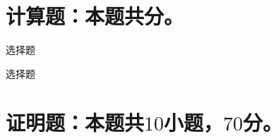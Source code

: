 \documentclass[12pt, a4paper]{article}
\def\mycenter#1{\begin{center} \bf \sffamily \large #1 \end{center}}
\begin{document}
\section{计算题：本题共\textmd{}分。}
\begin{question}[resume]
    \item 选择题 \\
    

    \item 选择题 \\
    
\end{question}


\section{证明题：本题共$10$小题，$70$分。}
\end{document}
